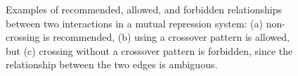 \begin{enumerate}
	\begin{figure}[h!]
	\centering
	\caption{Examples of recommended, allowed, and forbidden relationships between two interactions in a mutual repression system: (a) non-crossing is recommended, (b) using a crossover pattern is allowed, but (c) crossing without a crossover pattern is forbidden, since the relationship between the two edges is ambiguous.}
	\label{exa:4c}
	\end{figure}


\end{enumerate}
